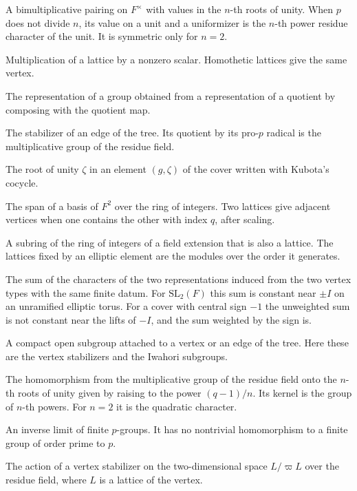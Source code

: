 \documentclass[12pt,letterpaper]{article}
\numberwithin{equation}{section}
\theoremstyle{definition}
\theoremstyle{remark}
\begin{document}
\begin{description}[style=nextline,leftmargin=1.5em]
\item[Hilbert symbol] A bimultiplicative pairing on $F^\times$ with values in the $n$-th roots of unity. When $p$ does not divide $n$, its value on a unit and a uniformizer is the $n$-th power residue character of the unit. It is symmetric only for $n=2$.
\item[Homothety] Multiplication of a lattice by a nonzero scalar. Homothetic lattices give the same vertex.
\item[Inflation] The representation of a group obtained from a representation of a quotient by composing with the quotient map.
\item[Iwahori subgroup] The stabilizer of an edge of the tree. Its quotient by its pro-$p$ radical is the multiplicative group of the residue field.
\item[Kubota coordinate] The root of unity $\zeta$ in an element $(g,\zeta)$ of the cover written with Kubota's cocycle.
\item[Lattice] The span of a basis of $F^2$ over the ring of integers. Two lattices give adjacent vertices when one contains the other with index $q$, after scaling.
\item[Order] A subring of the ring of integers of a field extension that is also a lattice. The lattices fixed by an elliptic element are the modules over the order it generates.
\item[Packet sum] The sum of the characters of the two representations induced from the two vertex types with the same finite datum. For $\mathrm{SL}_2(F)$ this sum is constant near $\pm I$ on an unramified elliptic torus. For a cover with central sign $-1$ the unweighted sum is not constant near the lifts of $-I$, and the sum weighted by the sign is.
\item[Parahoric subgroup] A compact open subgroup attached to a vertex or an edge of the tree. Here these are the vertex stabilizers and the Iwahori subgroups.
\item[Power residue character] The homomorphism from the multiplicative group of the residue field onto the $n$-th roots of unity given by raising to the power $(q-1)/n$. Its kernel is the group of $n$-th powers. For $n=2$ it is the quadratic character.
\item[Pro-$p$ group] An inverse limit of finite $p$-groups. It has no nontrivial homomorphism to a finite group of order prime to $p$.
\item[Reduction at a vertex] The action of a vertex stabilizer on the two-dimensional space $L/\varpi L$ over the residue field, where $L$ is a lattice of the vertex.

\end{description}
\end{document}
